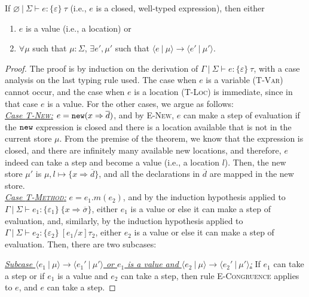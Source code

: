If $\varnothing~|~\Sigma \vdash e : \{ \varepsilon \}~\tau$ (i.e., $e$ is a closed, well-typed expression), then either
\begin{enumerate}
\item $e$ is a value (i.e., a location) or
\item $\forall \mu$ such that $\mu : \Sigma$,
   $\exists e', \mu'$ such that $\langle e~|~\mu \rangle \longrightarrow \langle e'~|~\mu' \rangle$.
\end{enumerate}

\begin{proof} The proof is by induction on the derivation of $\Gamma~|~\Sigma \vdash e : \{ \varepsilon \}~\tau$, with a case analysis on the last typing rule used. The case when $e$ is a variable (\textsc{T-Var}) cannot occur, and the case when $e$ is a location (\textsc{T-Loc}) is immediate, since in that case $e$ is a value. For the other cases, we argue as follows:
\\

\noindent\underline{\textit{Case \textsc{T-New}:}}
$e = \mathtt{new}(x \Rightarrow \overline{d})$, and by \textsc{E-New}, $e$ can make a step of evaluation if the $\mathtt{new}$ expression is closed and there is a location available that is not in the current store $\mu$. From the premise of the theorem, we know that the expression is closed, and there are infinitely many available new locations, and therefore, $e$ indeed can take a step and become a value (i.e., a location $l$). Then, the new store $\mu'$ is $\mu, l \mapsto \{ x \Rightarrow \overline{d} \}$, and all the declarations in $\overline{d}$ are mapped in the new store.
\\

\noindent\underline{\textit{Case \textsc{T-Method}:}}
\mbox{$e = e_1.m(e_2)$}, and by the induction hypothesis applied to\linebreak
\mbox{$\Gamma~|~\Sigma \vdash e_1 : \{ \varepsilon_1 \}~\{ x \Rightarrow \overline{\sigma} \}$}, either $e_1$ is a value or else it can make a step of evaluation, and, similarly, by the induction hypothesis applied to $\Gamma~|~\Sigma \vdash e_2 : \{ \varepsilon_2 \}~[e_1/x]\tau_2$, either $e_2$ is a value or else it can make a step of evaluation. Then, there are two subcases:

\underline{\textit{Subcase $\langle e_1~|~\mu \rangle \longrightarrow \langle e_1'~|~\mu' \rangle$ or $e_1$ is a value and $\langle e_2~|~\mu \rangle \longrightarrow \langle e_2'~|~\mu' \rangle$:}} If $e_1$ can take a step or if $e_1$ is a value and $e_2$ can take a step, then rule \textsc{E-Congruence} applies to $e$, and $e$ can take a step.


\end{proof}
